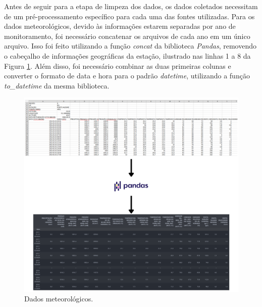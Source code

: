 Antes de seguir para a etapa de limpeza dos dados, os dados coletados necessitam de um pré-processamento específico para cada uma das fontes utilizadas. Para os dados meteorológicos, devido às informações estarem separadas por ano de monitoramento, foi necessário concatenar os arquivos de cada ano em um único arquivo. Isso foi feito utilizando a função \textit{concat} da biblioteca \textit{Pandas}, removendo o cabeçalho de informações geográficas da estação, ilustrado nas linhas 1 a 8 da Figura \ref{fig:base_inmet}. Além disso, foi necessário combinar as duas primeiras colunas e converter o formato de data e hora para o padrão \textit{datetime}, utilizando a função \textit{to\_datetime} da mesma biblioteca. 

\begin{figure}[H]
	\caption{\label{fig:base_inmet}Dados meteorológicos.}
	\begin{center}
		\includegraphics[scale=0.29]{figuras/base_inmet.png}
	\end{center}
\end{figure}
\pagebreak

